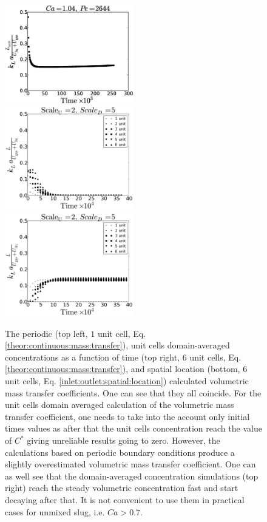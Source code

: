 \documentclass[review,12pt]{elsarticle}
\begin{document}
\begin{figure}
\includegraphics[width=0.5\textwidth]{volume_ca_104_scaleu2scaled5.eps}
\includegraphics[width=0.5\textwidth]{aver_moving_window6scaleu2scaled5.eps}\\
\includegraphics[width=0.5\textwidth]{flux_moving_window6scaleu2scaled5.eps}\\
\caption{The periodic (top left, $1$ unit cell, Eq. \ref{theor:continuous:mass:transfer}), unit
cells domain-averaged concentrations as a function of time (top right, $6$ unit cells, Eq.
\ref{theor:continuous:mass:transfer}), and spatial location
(bottom, $6$ unit cells, Eq. \ref{inlet:outlet:spatial:location}) calculated  volumetric mass
transfer
coefficients. One can see that they all coincide. {\color{red} For the unit cells domain averaged calculation of the volumetric mass transfer coefficient, one needs to take into the account only initial times values as after that the unit cells concentration reach the value of $C^{*}$ giving unreliable results going to zero.} However, the calculations based on periodic boundary conditions
produce a slightly overestimated volumetric mass transfer
coefficient. One can as well see that the domain-averaged concentration simulations (top right)
reach the steady volumetric concentration fast and start decaying after that. It is not convenient
to use them in practical cases for unmixed slug, i.e. $Ca>0.7$. \label{fig:periodic:ca1040}}
\end{figure}
\end{document}

